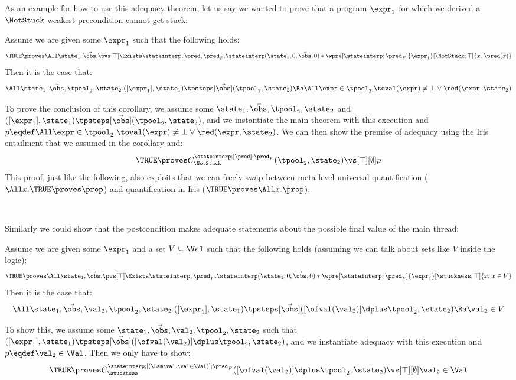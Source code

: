 As an example for how to use this adequacy theorem, let us say we wanted to prove that a program $\expr_1$ for which we derived a $\NotStuck$ weakest-precondition cannot get stuck:
\begin{cor}
  Assume we are given some $\expr_1$ such that the following holds:
\[
\TRUE \proves \All\state_1, \vec\obs. \pvs[\top] \Exists \stateinterp, \pred, \pred_F. \stateinterp(\state_1,0,\vec\obs,0) * \wpre[\stateinterp;\pred_F]{\expr_1}[\NotStuck;\top]{x.\; \pred(x)}
\]
  Then it is the case that:
\[
\All \state_1, \vec\obs, \tpool_2, \state_2. ([\expr_1], \state_1) \tpsteps[\vec\obs] (\tpool_2, \state_2) \Ra \All \expr \in \tpool_2. \toval(\expr) \neq \bot \lor \red(\expr, \state_2)
\]
\end{cor}
To prove the conclusion of this corollary, we assume some $\state_1, \vec\obs, \tpool_2, \state_2$ and $([\expr_1], \state_1) \tpsteps[\vec\obs] (\tpool_2, \state_2)$, and we instantiate the main theorem with this execution and $\metaprop \eqdef \All \expr \in \tpool_2. \toval(\expr) \neq \bot \lor \red(\expr, \state_2)$.
We can then show the premise of adequacy using the Iris entailment that we assumed in the corollary and:
\[ \TRUE \proves \consstate^{\stateinterp;[\pred];\pred_F}_{\NotStuck}(\tpool_2, \state_2) \vs[\top][\emptyset] \metaprop \]
This proof, just like the following, also exploits that we can freely swap between meta-level universal quantification ($\All x. \TRUE \proves \prop$) and quantification in Iris ($\TRUE \proves \All x. \prop$).

~\par

Similarly we could show that the postcondition makes adequate statements about the possible final value of the main thread:
\begin{cor}
  Assume we are given some $\expr_1$ and a set $V \subseteq \Val$ such that the following holds (assuming we can talk about sets like $V$ inside the logic):
\[
\TRUE \proves \All\state_1, \vec\obs. \pvs[\top] \Exists \stateinterp, \pred_F. \stateinterp(\state_1,0,\vec\obs,0) * \wpre[\stateinterp;\pred_F]{\expr_1}[\stuckness;\top]{x.\; x \in V}
\]
  Then it is the case that:
\[
\All \state_1, \vec\obs, \val_2, \tpool_2, \state_2. ([\expr_1], \state_1) \tpsteps[\vec\obs] ([\ofval(\val_2)] \dplus \tpool_2, \state_2) \Ra \val_2 \in V
\]
\end{cor}
To show this, we assume some $\state_1, \vec\obs, \val_2, \tpool_2, \state_2$ such that $([\expr_1], \state_1) \tpsteps[\vec\obs] ([\ofval(\val_2)] \dplus \tpool_2, \state_2)$, and we instantiate adequacy with this execution and $\metaprop \eqdef \val_2 \in \Val$.
Then we only have to show:
$$\TRUE \proves \consstate^{\stateinterp;[(\Lam \val. \val \in \Val)];\pred_F}_{\stuckness}([\ofval(\val_2)] \dplus \tpool_2, \state_2) \vs[\top][\emptyset] \val_2 \in \Val $$


